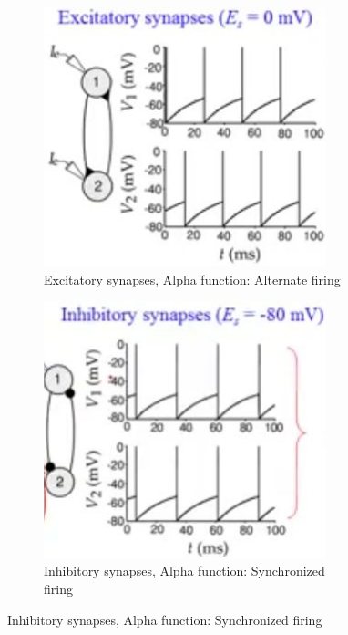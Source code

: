 \documentclass[]{article}
\begin{document}
\begin{figure}[H]
	\begin{center}
		\caption[Network of Integrate and Fire]{Network of Integrate and Fire. }
		\begin{subfigure}[t]{0.45\textwidth}
			\caption{Excitatory synapses, Alpha function: Alternate firing}
			\includegraphics[width=0.9\textwidth]{net-excitory}
		\end{subfigure}
		\begin{subfigure}[t]{0.45\textwidth}
			\caption{Inhibitory synapses, Alpha function: Synchronized firing}
			\includegraphics[width=0.9\textwidth]{net-inhibitory}
		\end{subfigure}
	\end{center}
\end{figure}
\end{document}
